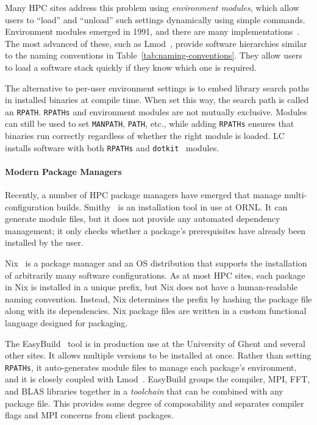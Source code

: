 Many HPC sites address this problem using {\it environment modules}, which
allow users to ``load'' and ``unload'' such settings dynamically using simple
commands. Environment modules emerged in 1991, and there are many implementations~\cite{dotkit,furlani+:lisa91,furlani+:lisa96,mclay:lmod,mclay:lmod-tutorial}.
The most advanced of these, such as Lmod~\cite{mclay:lmod,mclay:lmod-tutorial},
provide software hierarchies similar to the naming conventions in
Table~\ref{tab:naming-conventions}. They allow users to load a software stack
quickly if they know which one is required.

The alternative to per-user environment settings is to embed library search
paths in installed binaries at compile time. When set this way, the search
path is called an {\tt RPATH}. {\tt RPATHs} and environment modules are not
mutually exclusive. Modules can still be used to set {\tt MANPATH}, {\tt PATH},
etc., while adding {\tt RPATHs} ensures that binaries run correctly
regardless of whether the right module is loaded. LC installs software with
both {\tt RPATHs} and {\tt dotkit}~\cite{dotkit} modules.

\paragraph{Modern Package Managers}

Recently, a number of HPC package managers have emerged that manage
multi-configuration builds.
%
Smithy~\cite{digirolamo:smithy} is an installation tool in use at ORNL. It
can generate module files, but it does not provide any
automated dependency management; it only checks whether a package's
prerequisites have already been installed by the user.

Nix~\cite{dolstra+:icfp08,dolstra+:lisa04}
is a package manager and an OS distribution that supports the installation of
arbitrarily many software configurations.  As at most HPC sites, each package
in Nix is installed in a unique prefix, but Nix does not have a human-readable
naming convention.  Instead, Nix determines the prefix by hashing the package
file along with its dependencies. Nix package files are written in a custom
functional language designed for packaging.

The EasyBuild~\cite{hoste+:pyhpc12} tool is in production use at
the University of Ghent and several other sites.  It allows multiple versions
to be installed at once.  Rather than setting {\tt RPATHs}, it
auto-generates module files
to manage each package's environment, and it is closely coupled with
Lmod~\cite{geimer+:hust14}.  EasyBuild groups the compiler, MPI, FFT, and
BLAS libraries together in a {\it toolchain} that can be combined with
any package file. This provides some degree of composability and
separates compiler flags and MPI concerns from client packages.

